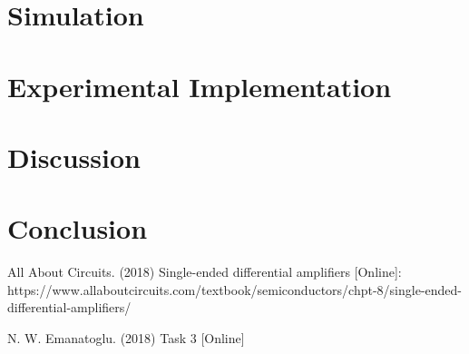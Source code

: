 \documentclass{article}
\begin{document}
  \section{Simulation}
    
    

     
 
    
  \section{Experimental Implementation}
    
    
  \section{Discussion}
     
    
    
    \section{Conclusion}
        

    



\clearpage

\appendix

\begin{thebibliography}{00}

 All About Circuits. (2018) Single-ended differential amplifiers [Online]: https://www.allaboutcircuits.com/textbook/semiconductors/chpt-8/single-ended-differential-amplifiers/

 N. W. Emanatoglu. (2018) Task 3 [Online]


\end{thebibliography}
\end{document}
